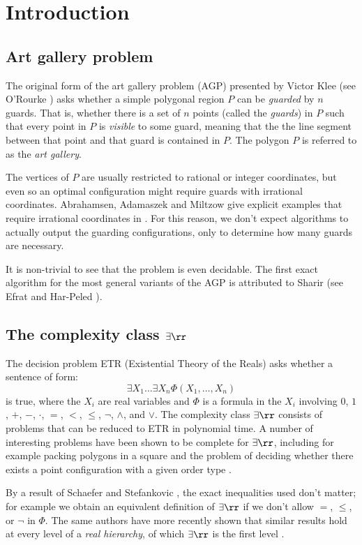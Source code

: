 \section{Introduction}
\subsection{Art gallery problem}
The original form of the art gallery problem (AGP) presented by Victor Klee (see O'Rourke \cite{ArtGalleryTextbook}) asks whether a simple polygonal region $P$ can be \emph{guarded} by $n$ guards. That is, whether there is a set of $n$ points (called the \emph{guards}) in $P$ such that every point in $P$ is \emph{visible} to some guard, meaning that the the line segment between that point and that guard is contained in $P$. The polygon $P$ is referred to as the \emph{art gallery}. 

The vertices of $P$ are usually restricted to rational or integer coordinates, but even so an optimal configuration might require guards with irrational coordinates. Abrahamsen, Adamaszek and Miltzow give explicit examples that require irrational coordinates in \cite{IrrationalGuards}. For this reason, we don't expect algorithms to actually output the guarding configurations, only to determine how many guards are necessary. 

It is non-trivial to see that the problem is even decidable. The first exact algorithm for the most general variants of the AGP is attributed to Sharir (see Efrat and Har-Peled \cite{FirstExact}). 

\subsection{The complexity class $\exists\rr$}

The decision problem ETR (Existential Theory of the Reals) asks whether a sentence of form:
\[\exists X_1\dots\exists X_n \Phi(X_1,\dots,X_n)\]
is true, where the $X_i$ are real variables and $\Phi$ is a formula in the $X_i$ involving $0$, $1$, $+$, $-$, $\cdot$, $=$, $<$, $\le$, $\neg$, $\wedge$, and $\vee$. The complexity class $\exists\rr$ consists of problems that can be reduced to ETR in polynomial time. A number of interesting problems have been shown to be complete for $\exists\rr$, including for example packing polygons in a square \cite{PackingProblem} and the problem of deciding whether there exists a point configuration with a given order type \cite{Mnev, Stretchability}.

By a result of Schaefer and Stefankovic \cite{ETRRobustness}, the exact inequalities used don't matter; for example we obtain an equivalent definition of $\exists\rr$ if we don't allow $=$, $\le$, or $\neg$ in $\Phi$. The same authors have more recently shown that similar results hold at every level of a \emph{real hierarchy}, of which $\exists\rr$ is the first level \cite{RealHeirarchy}.

